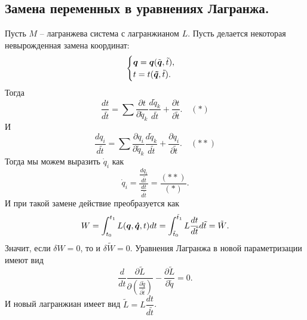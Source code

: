 \subsection{Замена переменных в уравнениях Лагранжа.}
Пусть $M$ -- лагранжева система с лагранжианом $L$.
Пусть делается некоторая невырожденная замена координат:
\[
    \begin{cases}
        \boldsymbol{q} = \boldsymbol{q}(\tilde{\boldsymbol{q}}, \tilde{t}), \\
        t = t(\boldsymbol{\tilde{q}}, \tilde{t}).
    \end{cases}
\]
Тогда
\[
    \dfrac{d t}{d \tilde{t}} = \sum \dfrac{\partial t}{\partial \tilde{q}_k} \dfrac{ d\tilde{q}_k}{d \tilde{t}} + \dfrac{\partial t}{\partial \tilde{ t}}. \quad (*)
\]
И
\[
    \dfrac{d q_i}{d \tilde{t}} = \sum \dfrac{\partial q_i}{\partial \tilde{q}_k} \dfrac{d \tilde{ q}_k}{d \tilde{t}} + \dfrac{\partial q_i}{\partial \tilde{t}}. \quad (**)
\]
Тогда мы можем выразить $\dot{q}_i$ как
\[
    \dot{q}_i = \dfrac{\frac{d q_i}{d \tilde{t}}}{\frac{d t}{d \tilde{t}}} = \dfrac{(**)}{(*)}.
\]
И при такой замене действие преобразуется как
\[
    W = \int_{t_0}^{t_1} L(\boldsymbol{q}, \boldsymbol{\dot{q}}, t)dt = \int_{\tilde{t}_0}^{\tilde{t}_1} L \dfrac{d t}{d \tilde{t}} d\tilde{t} = \tilde{W}.
\]
Значит, если $\delta W = 0$, то и $\delta \tilde{W} = 0$.
Уравнения Лагранжа в новой параметризации имеют вид
\[
    \dfrac{d}{dt} \dfrac{\partial \tilde{L}}{\partial (\frac{\partial \tilde{q}}{\partial \tilde{t}})} - \dfrac{\partial \tilde{L}}{\partial \tilde{q}} = 0.
\]
И новый лагранжиан имеет вид $\tilde{L} = L \dfrac{dt}{d \tilde{t}}$.
